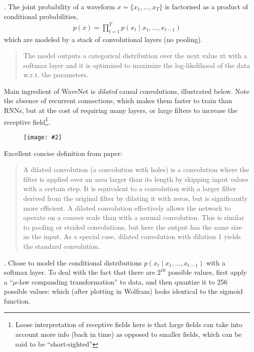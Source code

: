 \documentclass[11pt]{article}
\newcommand\myfig[2][0.3\textwidth]{\begin{figure}[h!]\centering\texttt{[image: \#2]}\end{figure}}
\newcommand\myspace[1][]{\vspace{#1\bigskipamount}}
\newcommand\p{\Needspace{10\baselineskip} \noindent}
\begin{document}
\myspace
\p {}. The joint probability of a waveform $x = \{x_1, \ldots, x_T\}$ is factorised as a product of conditional probabilities, 
\begin{align}
p(x) = \prod_{t = 1}^{T} p(x_t \mid x_1, \ldots, x_{t - 1})
\end{align}
which are modeled by a stack of convolutional layers (no pooling).  
\begin{quote}
	The model outputs a categorical distribution over the next value xt with a softmax layer and it is optimized to maximize the log-likelihood of the data w.r.t. the parameters.\\
\end{quote}

\p Main ingredient of WaveNet is \textit{dilated} causal convolutions, illustrated below. Note the absence of recurrent connections, which makes them faster to train than RNNs, but at the cost of requiring many layers,  or large filters to increase the receptive field\footnote{Loose interpretation of receptive fields here is that large fields can take into account more info (back in time) as opposed to smaller fields, which can be said to be ``short-sighted''}. 

\myfig[0.5\textwidth]{CausalConv.PNG}

\p Excellent concise definition from paper:
\begin{quote}
	A dilated convolution (a convolution with holes) is a convolution where the filter is applied over an area larger than its length by skipping input values with a certain step. It is equivalent to a convolution with a larger filter derived from the original filter by dilating it with zeros, but is significantly more efficient. A dilated convolution effectively allows the network to operate on
	a coarser scale than with a normal convolution. This is similar to pooling or strided convolutions, but
	here the output has the same size as the input. As a special case, dilated convolution with dilation
	1 yields the standard convolution.
\end{quote}

\myspace
\p {}. Chose to model the conditional distributions $p(x_t \mid x_1, \ldots, x_{t -1})$ with a softmax layer. To deal with the fact that there are $2^{16}$ possible values, first apply a ``$\mu$-law companding transformation'' to data, and then quantize it to 256 possible values:
which (after plotting in Wolfram) looks identical to the sigmoid function.
\end{document}
